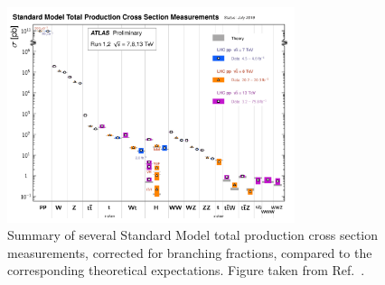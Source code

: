 \begin{figure}[!htb]
    \begin{center}
        \includegraphics[width=0.75\textwidth]{figures/chapter1/sm_final/sm_xsec_summary}
        \caption{
            Summary of several Standard Model total production cross section measurements,
            corrected for branching fractions, compared to the corresponding theoretical expectations. 
            Figure taken from Ref.~\cite{SMSummaryXsec}.
        }
        \label{fig:sm_xsec_summary}
    \end{center}
\end{figure}
